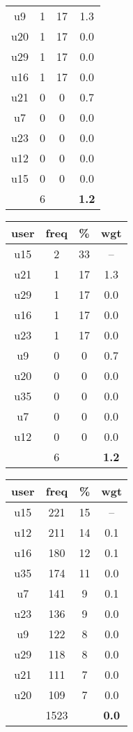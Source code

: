 \begin{appendices}
\begin{table}
\begin{tabular}{ |c|c|c|c| }
	u9 & 1 & 17 & 1.3 \\
	u20 & 1 & 17 & 0.0 \\
	u29 & 1 & 17 & 0.0 \\
	u16 & 1 & 17 & 0.0 \\
	u21 & 0 & 0 & 0.7 \\
	u7 & 0 & 0 & 0.0 \\
	u23 & 0 & 0 & 0.0 \\
	u12 & 0 & 0 & 0.0 \\
	u15 & 0 & 0 & 0.0 \\
	 & 6 & & \textbf{1.2} \\
	\hline
\end{tabular}
\begin{tabular}{ |c|c|c|c| }
	\hline
	\textbf{user} & \textbf{freq} & \textbf{\%} & \textbf{wgt} \\
	\hline
	u15 & 2 & 33 & -- \\
	u21 & 1 & 17 & 1.3 \\
	u29 & 1 & 17 & 0.0 \\
	u16 & 1 & 17 & 0.0 \\
	u23 & 1 & 17 & 0.0 \\
	u9 & 0 & 0 & 0.7 \\
	u20 & 0 & 0 & 0.0 \\
	u35 & 0 & 0 & 0.0 \\
	u7 & 0 & 0 & 0.0 \\
	u12 & 0 & 0 & 0.0 \\
	 & 6 & & \textbf{1.2} \\
	\hline
\end{tabular}
\begin{tabular}{ |c|c|c|c| }
	\hline
	\textbf{user} & \textbf{freq} & \textbf{\%} & \textbf{wgt} \\
	\hline
	u15 & 221 & 15 & -- \\
	u12 & 211 & 14 & 0.1 \\
	u16 & 180 & 12 & 0.1 \\
	u35 & 174 & 11 & 0.0 \\
	u7 & 141 & 9 & 0.1 \\
	u23 & 136 & 9 & 0.0 \\
	u9 & 122 & 8 & 0.0 \\
	u29 & 118 & 8 & 0.0 \\
	u21 & 111 & 7 & 0.0 \\
	u20 & 109 & 7 & 0.0 \\
	 & 1523 & & \textbf{0.0} \\

\end{tabular}
\end{table}
\end{appendices}
